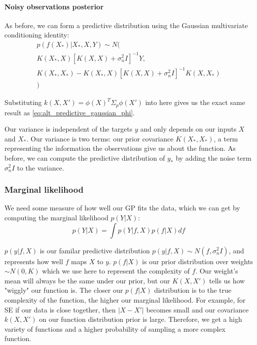 \documentclass[10pt]{article}
\begin{document}
\paragraph{Noisy observations posterior}
As before, we can form a predictive distribution using the Gaussian multivariate conditioning identity:
\begin{equation*}
    \begin{aligned}
        p(f(X_*)|X_*, X, Y) \sim N( \\
        K(X_*,X)[K(X,X) + \sigma^2_nI]^{-1}Y, \\
        K(X_*,X_*) - K(X_*,X)[K(X,X) + \sigma^2_nI]^{-1}K(X,X_*) \\
        )
    \end{aligned}
\end{equation*}

Substituting $k(X,X') = \phi(X)^T\Sigma_p\phi(X')$ into here gives us the exact same result as \ref{eq:alt_predictive_gaussian_phi}.

Our variance is independent of the targets $y$ and only depends on our inputs $X$ and $X_*$. Our variance is two terms: our prior covariance $K(X_*,X_*)$, a term representing the information the observations give us about the function. As before, we can compute the predictive distribution of $y_*$ by adding the noise term $\sigma^2_nI$ to the variance.

\subsubsection{Marginal likelihood}
We need some measure of how well our GP fits the data, which we can get by computing the marginal likelihood $p(Y|X)$:
\begin{equation*}
    p(Y|X) = \int p(Y|f,X)p(f|X) df
\end{equation*}

$p(y|f,X)$ is our familar predictive distribution $p(y|f,X) \sim N(f, \sigma^2_nI)$, and represents how well $f$ maps $X$ to $y$. $p(f|X)$ is our prior distribution over weights $\sim N(0, K)$ which we use here to represent the complexity of $f$. Our weight's mean will always be the same under our prior, but our $K(X,X')$ tells us how "wiggly" our function is. The closer our $p(f|X)$ distribution is to the true complexity of the function, the higher our marginal likelihood. For example, for SE if our data is close together, then $|X - X'|$ becomes small and our covariance $k(X,X')$ on our function distribution prior is large. Therefore, we get a high variety of functions and a higher probability of sampling a more complex function. %
    
\end{document}
